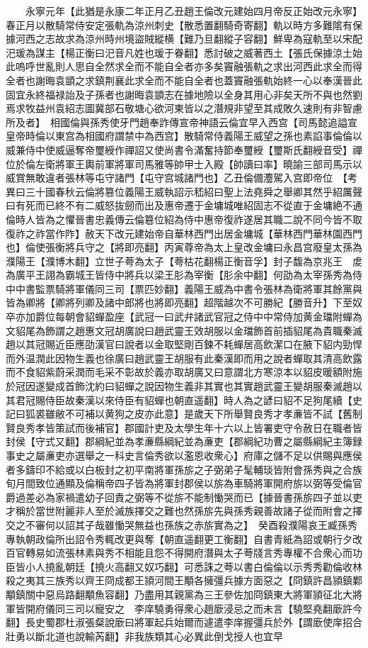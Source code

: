　　永寧元年【此猶是永康二年正月乙丑趙王倫改元建始四月帝反正始改元永寧】春正月以散騎常侍安定張軌為涼州刺史【散悉置翻騎奇寄翻】軌以時方多難隂有保據河西之志故求為涼州時州境盜賊縱横【難乃旦翻縱子容翻】鮮卑為寇軌至以宋配汜瑗為謀主【楊正衡曰汜音凡姓也瑗于眷翻】悉討破之威著西土【張氏保據涼土始此嗚呼世亂則人思自全然求全而不能自全者亦多矣竇融張軌之求出河西此求全而得全者也謝晦袁顗之求鎮荆襄此求全而不能自全者也蓋竇融張軌始終一心以奉漢晉此固宜永終福禄詒及子孫者也謝晦袁顗志在據地險以全身其用心非矣天所不與也然劉焉求牧益州袁紹志圖冀部石敬塘心欲河東皆以之潛規非望至其成敗久速則有非智慮所及者】　相國倫與孫秀使牙門趙奉詐傳宣帝神語云倫宜早入西宫【司馬懿追謚宣皇帝時倫以東宫為相國府謂禁中為西宫】散騎常侍義陽王威望之孫也素諂事倫倫以威兼侍中使威逼奪帝璽綬作禪詔又使尚書令滿奮持節奉璽綬【璽斯氏翻綬音受】禪位於倫左衛將軍王輿前軍將軍司馬雅等帥甲士入殿【帥讀曰率】曉諭三部司馬示以威賞無敢違者張林等屯守諸門【屯守宫城諸門也】乙丑倫備灋駕入宫即帝位　【考異曰三十國春秋云倫將篡位義陽王威執詔示嵇紹曰聖上法堯舜之舉卿其然乎紹厲聲曰有死而已終不有二威怒抜劒而出及惠帝遷于金墉城唯紹固志不從直于金墉絶不通倫時人皆為之懼晉書忠義傳云倫簒位紹為侍中惠帝復祚遂居其職二說不同今皆不取　復祚之祚當作阼】赦天下改元建始帝自華林西門出居金墉城【華林西門華林園西門也】倫使張衡將兵守之【將即亮翻】丙寅尊帝為太上皇改金墉曰永昌宫廢皇太孫為濮陽王【濮博木翻】立世子荂為太子【荂枯花翻楊正衡音孚】封子馥為京兆王　䖍為廣平王詡為霸城王皆侍中將兵以梁王肜為宰衡【肜余中翻】何劭為太宰孫秀為侍中中書監票騎將軍儀同三司【票匹妙翻】義陽王威為中書令張林為衛將軍其餘黨與皆為卿將【卿將列卿及諸中郎將也將即亮翻】超階越次不可勝紀【勝音升】下至奴卒亦加爵位每朝會貂蟬盈座【武冠一曰武弁諸武官冠之侍中中常侍加黄金璫附蟬為文貂尾為飾謂之趙惠文冠胡廣說曰趙武靈王效胡服以金璫飾首前插貂尾為貴職秦滅趙以其冠賜近臣應劭漢官曰說者以金取堅剛百鍊不耗蟬居高飲潔口在腋下貂内勁悍而外温潤此因物生義也徐廣曰趙武靈王胡服有此秦漢即而用之說者蟬取其清高飲露而不食貂紫蔚采潤而毛采不彰故於義亦取胡廣又曰意謂北方寒涼本以貂皮暖額附施於冠因遂變成首飾沈約曰貂蟬之說因物生義非其實也其實趙武靈王變胡服秦滅趙以其君冠賜侍臣故秦漢以來侍臣有貂蟬也朝直遥翻】時人為之諺曰貂不足狗尾續【史記曰狐裘雖敝不可補以黄狗之皮亦此意】是歲天下所舉賢良秀才孝亷皆不試【舊制賢良秀孝皆策試而後補官】郡國計吏及太學生年十六以上皆署吏守令赦日在職者皆封侯【守式又翻】郡綱紀並為孝亷縣綱紀並為亷吏【郡綱紀功曹之屬縣綱紀主簿録事史之屬亷吏亦選舉之一科史言倫秀欲以濫恩收衆心】府庫之儲不足以供賜與應侯者多鑄印不給或以白板封之初平南將軍孫旂之子弼弟子髦輔琰皆附會孫秀與之合族旬月間致位通顯及倫稱帝四子皆為將軍封郡侯以旂為車騎將軍開府旂以弼等受倫官爵過差必為家禍遣幼子回責之弼等不從旂不能制慟哭而已【據晉書孫旂四子並以吏才稱於當世附麗非人至於滅族擇交之難也然孫旂先與孫秀親善故諸子從而附會之擇交之不審何以詔其子哉雖慟哭無益也孫族之赤旂實為之】　癸酉殺濮陽哀王臧孫秀專執朝政倫所出詔令秀輒改更與奪【朝直遥翻更工衡翻】自書青紙為詔或朝行夕改百官轉易如流張林素與秀不相能且怨不得開府潛與太子荂牋言秀專權不合衆心而功臣皆小人撓亂朝廷【撓火高翻又奴巧翻】可悉誅之荂以書白倫倫以示秀秀勸倫收林殺之夷其三族秀以齊王冏成都王頴河間王顒各擁彊兵據方面惡之【冏鎮許昌頴鎮鄴顒鎮關中惡烏路翻顒魚容翻】乃盡用其親黨為三王參佐加冏鎮東大將軍頴征北大將軍皆開府儀同三司以寵安之　李庠驍勇得衆心趙廞浸忌之而未言【驍堅堯翻廞許今翻】長史蜀郡杜淑張粲說廞曰將軍起兵始爾而遽遣李庠握彊兵於外【謂廞使庠招合壯勇以斷北道也說輸芮翻】非我族類其心必異此倒戈授人也宜早